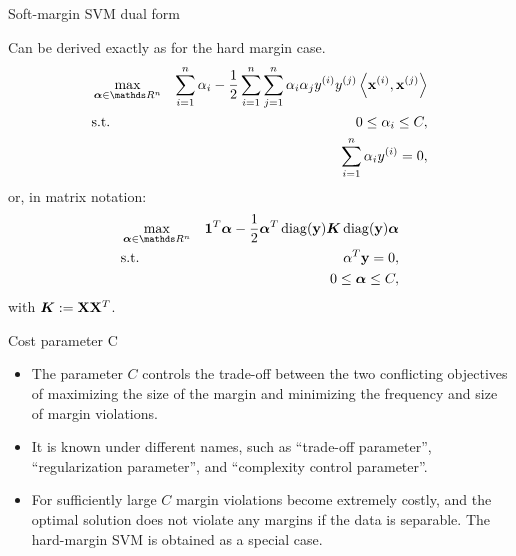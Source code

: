 \documentclass[11pt,compress,t,notes=noshow, xcolor=table]{beamer}
\begin{document}
\begin{vbframe}{Soft-margin SVM dual form}

Can be derived exactly as for the hard margin case.
\begin{eqnarray*}
    & \max\limits_{\alphav \in \R^n} & \sum_{i=1}^n \alpha_i - \frac{1}{2}\sum_{i=1}^n\sum_{j=1}^n\alpha_i\alpha_j\yi y^{(j)} \scp{\xi}{\xv^{(j)}} \\
    & \text{s.t. } & 0 \le \alpha_i \le C, \\
    & \quad & \sum_{i=1}^n \alpha_i \yi = 0,
\end{eqnarray*}
or, in matrix notation:
\begin{eqnarray*}
  & \max\limits_{\alphav \in \R^n} &  \one^T \alphav - \frac{1}{2} \alphav^T \diag(\yv) \bm{K} \diag(\yv) \alphav \\
  & \text{s.t.} & \alpha^T \yv = 0, \\
  &  & 0 \leq \alphav \leq C,
\end{eqnarray*}
with $\bm{K}:=\mathbf{X} \mathbf{X}^T$.
\end{vbframe}

\begin{vbframe}{Cost parameter C}

  \begin{itemize}
    \item The parameter $C$ controls the trade-off between the two conflicting
    objectives of maximizing the size of the margin and minimizing the frequency and size of margin
    violations.
    \item It is known under different names, such as \enquote{trade-off parameter}, \enquote{regularization parameter},
    and \enquote{complexity control parameter}.
    \item   For sufficiently large $C$ margin violations become extremely costly,
  and the optimal solution does not violate any margins if the
  data is separable. The hard-margin SVM is obtained as a special case.
  \end{itemize}
\end{vbframe}
\end{document}
